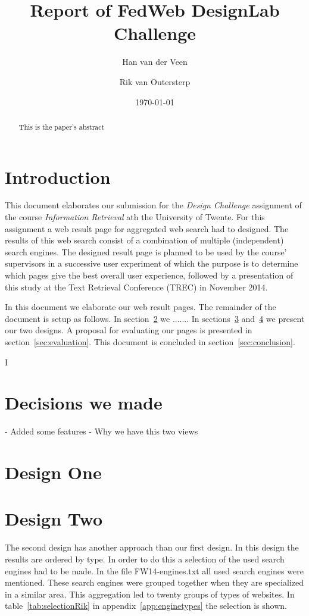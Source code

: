 \documentclass[12pt]{article}
\title{Report of FedWeb DesignLab Challenge}
\author{
        Han van der Veen \\
            \and
			Rik van Outersterp
}
\date{\today}
\begin{document}
\maketitle

\begin{abstract}
This is the paper's abstract
\end{abstract}

\section{Introduction}
This document elaborates our submission for the \textit{Design Challenge} assignment of the course \textit{Information Retrieval} ath the University of Twente. 
For this assignment a web result page for aggregated web search had to designed.
The results of this web search consist of a combination of multiple (independent) search engines.
The designed result page is planned to be used by the course' supervisors in a successive user experiment of which the purpose is to determine which pages give the best overall user experience, followed by a presentation of this study at the Text Retrieval Conference (TREC) in November 2014.

In this document we elaborate our web result pages.
The remainder of the document is setup as follows.
In section~\ref{sec:decisions} we .......
In sections~\ref{sec:layoutHan} and~\ref{sec:layoutRik} we present our two designs. 
A proposal for evaluating our pages is presented in section~\ref{sec:evaluation}.
This document is concluded in section~\ref{sec:conclusion}.

I

\section{Decisions we made}
\label{sec:decisions}
- Added some features
- Why we have this two views

\section{Design One}
\label{sec:layoutHan}


\section{Design Two}
\label{sec:layoutRik}
The second design has another approach than our first design.
In this design the results are ordered by type.
In order to do this a selection of the used search engines had to be made.
In the file FW14-engines.txt all used search engines were mentioned.
These search engines were grouped together when they are specialized in a similar area.
This aggregation led to twenty groups of types of websites.
In table~\ref{tab:selectionRik} in appendix~\ref{app:enginetypes} the selection is shown.
\end{document}
